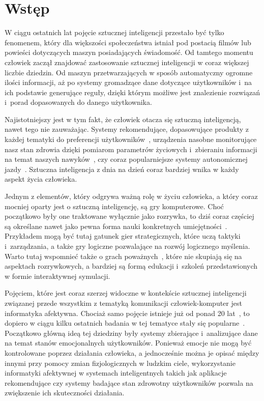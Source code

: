 \chapter{Wstęp}
\label{cha:wstep}
W ciągu ostatnich lat pojęcie sztucznej inteligencji przestało być tylko fenomenem, który dla większości społeczeństwa istniał pod postacią filmów lub powieści dotyczących maszyn posiadających świadomość. Od tamtego momentu człowiek zaczął znajdować zastosowanie sztucznej inteligencji w coraz większej liczbie dziedzin. Od maszyn przetwarzających w sposób automatyczny ogromne ilości informacji, aż po systemy gromadzące dane dotyczące użytkowników i~na ich podstawie generujące reguły, dzięki którym możliwe jest znalezienie rozwiązań i~porad dopasowanych do danego użytkownika.

Najistotniejszy jest w tym fakt, że człowiek otacza się sztuczną inteligencją, nawet tego nie zauważając. Systemy rekomendujące, dopasowujące produkty z każdej tematyki do preferencji użytkowników~\cite{Gomez-Uribe:2015:NRS:2869770.2843948}, urządzenia nasobne monitorujące nasz stan zdrowia dzięki pomiarom parametrów życiowych i~zbieraniu informacji na temat naszych nawyków~\cite{wearable_computing_amft}, czy coraz popularniejsze systemy autonomicznej jazdy~\cite{dikmen_tesla_autopilot}. Sztuczna inteligencja z dnia na dzień coraz bardziej wnika w każdy aspekt życia człowieka. 

Jednym z elementów, który odgrywa ważną rolę w życiu człowieka, a który coraz mocniej oparty jest o sztuczną inteligencję, są gry komputerowe.  Choć początkowo były one traktowane wyłącznie jako rozrywka, to dziś coraz częściej są określane nawet jako pewna forma nauki konkretnych umiejętności~\cite{oberdorfer_develop_your_strengths_by_gaming}. Przykładem mogą być tutaj gatunek gier strategicznych, które uczą taktyki i~zarządzania, a także gry logiczne pozwalające na rozwój logicznego myślenia. Warto tutaj wspomnieć także o grach poważnych~\cite{serious_games_michael_chen}, które nie skupiają się na aspektach rozrywkowych, a bardziej są formą edukacji i~szkoleń przedstawionych w formie interaktywnej symulacji.

Pojęciem, które jest coraz szerzej widoczne w kontekście sztucznej inteligencji związanej przede wszystkim z tematyką komunikacji człowiek-komputer jest informatyka afektywna. Chociaż samo pojęcie istnieje już od ponad 20 lat~\cite{Picard:1997:AC:265013}, to dopiero w ciągu kilku ostatnich badania w tej tematyce stały się popularne~\cite{gartner_hype_cycles_2018}. Początkowo główną ideą tej dziedziny były systemy zbierające i~analizujące dane na temat stanów emocjonalnych użytkowników. Ponieważ emocje nie mogą być kontrolowane poprzez działania człowieka, a jednocześnie można je opisać między innymi przy pomocy zmian fizjologicznych w ludzkim ciele, wykorzystanie informatyki afektywnej w systemach inteligentnych takich jak aplikacje rekomendujące czy systemy badające stan zdrowotny użytkowników pozwala na zwiększenie ich skuteczności działania.

